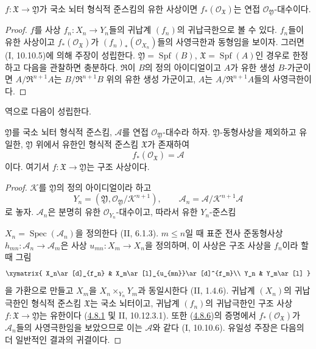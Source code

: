 \begin{proposition}[4.8.6]
\label{III.4.8.6-fr}
$f:\mathfrak X\to\mathfrak Y$가 국소 뇌터 형식적 준스킴의 유한
사상이면 $f_*(\mathcal O_{\mathfrak X})$는 연접
$\mathcal O_{\mathfrak Y}$-대수이다.
\end{proposition}

\begin{proof}
$f$를 사상 $f_n:X_n\to Y_n$들의 귀납계 $(f_n)$의 귀납극한으로
볼 수 있다. $f_n$들이 유한 사상이고
$f_*(\mathcal O_{\mathfrak X})$가
$(f_n)_*(\mathcal O_{X_n})$들의 사영극한과 동형임을 보이자.
그러면 (I, 10.10.5)에 의해 주장이 성립한다.
$\mathfrak Y=\operatorname{Spf}(B)$,
$\mathfrak X=\operatorname{Spf}(A)$인 경우로 한정하고 다음을
관찰하면 충분하다. $\mathfrak R$이 $B$의 정의 아이디얼이고
$A$가 유한 생성 $B$-가군이면
$A/\mathfrak R^{n+1}A$는
$B/\mathfrak R^{n+1}B$ 위의 유한 생성 가군이고, $A$는
$A/\mathfrak R^{n+1}A$들의 사영극한이다.
\end{proof}

역으로 다음이 성립한다.

\begin{proposition}[4.8.7]
\label{III.4.8.7-fr}
$\mathfrak Y$를 국소 뇌터 형식적 준스킴,
$\mathcal A$를 연접 $\mathcal O_{\mathfrak Y}$-대수라 하자.
$\mathfrak Y$-동형사상을 제외하고 유일한, $\mathfrak Y$ 위에서
유한인 형식적 준스킴 $\mathfrak X$가 존재하여
\[
f_*(\mathcal O_{\mathfrak X})=\mathcal A
\]
이다. 여기서 $f:\mathfrak X\to\mathfrak Y$는 구조 사상이다.
\end{proposition}

\begin{proof}
$\mathcal K$를 $\mathfrak Y$의 정의 아이디얼이라 하고
\[
Y_n=(\mathfrak Y,\mathcal O_{\mathfrak Y}/\mathcal K^{n+1}),
\qquad
\mathcal A_n=\mathcal A/\mathcal K^{n+1}\mathcal A
\]
로 놓자. $\mathcal A_n$은 분명히 유한
$\mathcal O_{Y_n}$-대수이고, 따라서 유한 $Y_n$-준스킴


$X_n=\operatorname{Spec}(\mathcal A_n)$을 정의한다 (II, 6.1.3).
$m\leq n$일 때 표준 전사 준동형사상
$h_{mn}:\mathcal A_n\to\mathcal A_m$은 사상
$u_{mn}:X_m\to X_n$을 정의하며, 이 사상은 구조 사상을 $f_n$이라
할 때 그림
\[
\xymatrix{
X_n\ar[d]_{f_n} & X_m\ar[l]_{u_{mn}}\ar[d]^{f_m}\\
Y_n & Y_m\ar[l]
}
\]
을 가환으로 만들고 $X_m$을
$X_n\times_{Y_n}Y_m$과 동일시한다 (II, 1.4.6).
귀납계 $(X_n)$의 귀납극한인 형식적 준스킴 $\mathfrak X$는 국소
뇌터이고, 귀납계 $(f_n)$의 귀납극한인 구조 사상
$f:\mathfrak X\to\mathfrak Y$는 유한이다
(\hyperref[III.4.8.1-fr]{4.8.1} 및 II, 10.12.3.1).
또한 (\hyperref[III.4.8.6-fr]{4.8.6})의 증명에서
$f_*(\mathcal O_{\mathfrak X})$가 $\mathcal A_n$들의 사영극한임을
보았으므로 이는 $\mathcal A$와 같다 (I, 10.10.6).
유일성 주장은 다음의 더 일반적인 결과의 귀결이다.
\end{proof}

